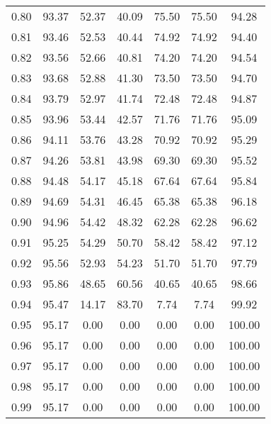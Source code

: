 \begin{tabular}{|c|c|c|c|c|c|c|}
      0.80 &     93.37 &     52.37 &      40.09 &   75.50 &      75.50 &         94.28 \\
      0.81 &     93.46 &     52.53 &      40.44 &   74.92 &      74.92 &         94.40 \\
      0.82 &     93.56 &     52.66 &      40.81 &   74.20 &      74.20 &         94.54 \\
      0.83 &     93.68 &     52.88 &      41.30 &   73.50 &      73.50 &         94.70 \\
      0.84 &     93.79 &     52.97 &      41.74 &   72.48 &      72.48 &         94.87 \\
      0.85 &     93.96 &     53.44 &      42.57 &   71.76 &      71.76 &         95.09 \\
      0.86 &     94.11 &     53.76 &      43.28 &   70.92 &      70.92 &         95.29 \\
      0.87 &     94.26 &     53.81 &      43.98 &   69.30 &      69.30 &         95.52 \\
      0.88 &     94.48 &     54.17 &      45.18 &   67.64 &      67.64 &         95.84 \\
      0.89 &     94.69 &     54.31 &      46.45 &   65.38 &      65.38 &         96.18 \\
      0.90 &     94.96 &     54.42 &      48.32 &   62.28 &      62.28 &         96.62 \\
      0.91 &     95.25 &     54.29 &      50.70 &   58.42 &      58.42 &         97.12 \\
      0.92 &     95.56 &     52.93 &      54.23 &   51.70 &      51.70 &         97.79 \\
      0.93 &     95.86 &     48.65 &      60.56 &   40.65 &      40.65 &         98.66 \\
      0.94 &     95.47 &     14.17 &      83.70 &    7.74 &       7.74 &         99.92 \\
      0.95 &     95.17 &      0.00 &       0.00 &    0.00 &       0.00 &        100.00 \\
      0.96 &     95.17 &      0.00 &       0.00 &    0.00 &       0.00 &        100.00 \\
      0.97 &     95.17 &      0.00 &       0.00 &    0.00 &       0.00 &        100.00 \\
      0.98 &     95.17 &      0.00 &       0.00 &    0.00 &       0.00 &        100.00 \\
      0.99 &     95.17 &      0.00 &       0.00 &    0.00 &       0.00 &        100.00 \\
\bottomrule
\end{tabular}

